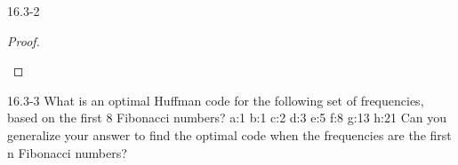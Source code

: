 \begin{problem}{16.3-2}
\begin{solution}
\begin{proof}
\begin{figure}[H]
      \end{figure}
    \end{proof}
  \end{solution}
\end{problem}

\begin{problem}{16.3-3}
  What is an optimal Huffman code for the following set of frequencies, based on the first 8 Fibonacci numbers?
  \br
  a:1 b:1 c:2 d:3 e:5 f:8 g:13 h:21
  \br
  Can you generalize your answer to find the optimal code when the frequencies are the first n Fibonacci numbers?
\end{problem}



